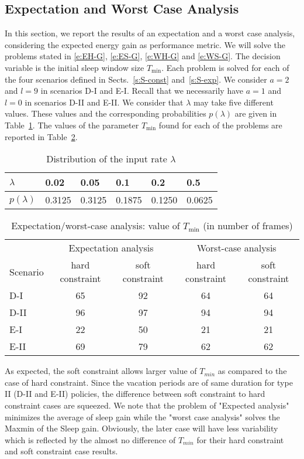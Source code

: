 \documentclass[journal]{IEEEtran}
\begin{document}
\subsection{Expectation and Worst Case Analysis}
\label{s:WorstExp}
In this section, we report the results of an expectation and a worst case analysis, considering the expected energy gain as performance metric. We will solve the problems stated in \eqref{e:EH-G},
\eqref{e:ES-G}, \eqref{e:WH-G} and \eqref{e:WS-G}. The decision variable is the initial sleep window size $T_{\min}$. Each problem is solved for each of the four scenarios defined in Sects.~\ref{s:S-const} and~\ref{s:S-exp}. We consider $a=2$ and $l=9$ in scenarios D-I and E-I. Recall that we necessarily have $a=1$ and $l=0$ in scenarios D-II and E-II. We consider that $\lambda$ may take five different values. These values and the corresponding probabilities $p(\lambda)$ are given in Table~\ref{t:lambda}. The values of the parameter $T_{\min}$ found for each of the problems are reported in Table~\ref{t:Tmin}.
\begin{table}[tbh]
\begin{center}
\caption{Distribution of the input rate $\lambda$}
\label{t:lambda}{ \scriptsize

\begin{tabular}{|l||lllll|}
\hline
$\lambda$ & 0.02 & 0.05 & 0.1 & 0.2 & 0.5 \\
\hline
$p(\lambda)$ & 0.3125 & 0.3125 & 0.1875 & 0.1250 & 0.0625 \\
\hline
\end{tabular} }
\end{center}
\end{table}
\begin{table}[tbh]
\begin{center}
\caption{Expectation/worst-case analysis: value of $T_{\min}$ (in number of frames)}
\label{t:Tmin}{ \scriptsize
\begin{tabular}{|l||c|c|c|c|}
\hline
& \multicolumn{2}{c|}{Expectation analysis} &\multicolumn{2}{c|}{Worst-case analysis} \\
Scenario & hard constraint & soft constraint & hard constraint & soft constraint \\
\hline
D-I & 65 & 92 & 64 & 64 \\
D-II & 96 & 97 & 94 & 94 \\
E-I & 22 & 50 & 21 & 21 \\
E-II & 69 & 79 & 62 & 62 \\
\hline
\end{tabular} }
\end{center}
\end{table}
As expected, the soft constraint allows larger value of $T_{min}$ as compared to the case of hard constraint. Since the vacation periods are of same duration for type II (D-II and E-II) policies, the difference between soft constraint to hard constraint cases are squeezed. We note that the problem of "Expected analysis" minimizes the average of sleep gain while the "worst case analysis" solves the Maxmin of the Sleep gain. Obviously, the later case will have less variability which is reflected by the almost no difference of $T_{min}$ for their hard constraint and soft constraint case results. 
\end{document}
